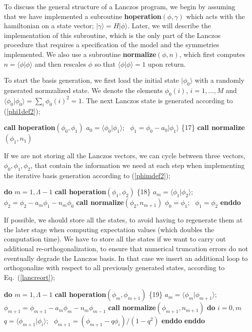 \documentclass[draft,numberedheadings]{aipproc}
\newcommand{\code}{\null\vskip-2mm\noindent}
\newcommand{\br}{\hfill\break}
\newcommand{\cia}{\null\hskip5mm}
\newcommand{\cib}{\null\hskip10mm}
\newcommand{\cic}{\null\hskip15mm}
\begin{document}
To discuss the general structure of a Lanczos program, we begin by assuming that we have implemented a subroutine {\bf hoperation}$(\phi,\gamma)$ which acts with 
the hamiltonian on a state vector; $|\gamma\rangle=H|\phi\rangle$. Later, we will describe the implementation of this subroutine, which is the only part of the 
Lanczos procedure that requires a specification of the model and the symmetries implemented. We also use a subroutine {\bf normalize}$(\phi,n)$, which first 
computes $n=\langle \phi|\phi\rangle$ and then rescales $\phi$ so that $\langle \phi|\phi\rangle=1$ upon return. 

To start the basis generation, we first load the initial state $|\phi_0\rangle$ with a randomly generated normzalized state. We denote the elements 
$\phi_0(i)$, $i=1,\ldots,M$ and $\langle \phi_0|\phi_0\rangle = \sum_i\phi_0(i)^2=1$. The next Lanczos state is generated according to (\ref{phi1def2});

{\code
\cia    {\bf call hoperation}$(\phi_0,\phi_1)$ \br
\cia    $a_0=\langle \phi_0|\phi_1\rangle$;~ $\phi_1=\phi_0-a_0|\phi_1\rangle$ \hfill  \{17\}\break 
\cia    {\bf call normalize}$(\phi_1,n_1)$ 
\code}

\noindent
If we are not storing all the Lanczos vectors, we can cycle between three vectors, $\phi_0,\phi_1,\phi_2$, that contain the information we need at 
each step when implementing the iterative basis generation according to (\ref{phimdef2});

{\code
\cia    {\bf do} $m=1,\Lambda-1$ \br
\cib       {\bf call hoperation}$(\phi_1,\phi_2)$                \hfill  \{18\}\break 
\cib       $a_{m}=\langle \phi_1|\phi_2\rangle$;~ $\phi_2=\phi_2-a_{m}\phi_1-n_m\phi_0$ \br
\cib       {\bf call normalize}$(\phi_2,n_{m+1})$  \br 
\cib       $\phi_0=\phi_1$;~ $\phi_1=\phi_2$ \br
\cia    {\bf enddo} 
\code}

\noindent
If possible, we should store all the states, to avoid having to regenerate them at the later stage when computing expectation values (which doubles
the computation time). We have to store
all the states if we want to carry out additional re-orthogonalization, to ensure that numerical truncation errors do not eventually degrade the Lanczos 
basis. In that case we insert an additional loop to orthogonalize with respect to all previously generated states, according to Eq.~(\ref{lancreort});

{\code
\cia    {\bf do} $m=1,\Lambda-1$ \br
\cib       {\bf call hoperation}$(\phi_m,\phi_{m+1})$ \hfill  \{19\}\break 
\cib       $a_m=\langle \phi_m|\phi_{m+1}\rangle$;~ $\phi_{m+1}=\phi_{m+1}-a_m\phi_m-n_m\phi_{m-1}$ \br
\cib       {\bf call normalize}$(\phi_{m+1},n_{m+1})$  \br 
\cib       {\bf do} $i=0,m$ \br
\cic           $q=\langle \phi_{m+1}|\phi_{i}\rangle$;~ $\phi_{m+1}=(\phi_{m+1}-q\phi_i)/(1-q^2)$ \br
\cib       {\bf enddo} \br
\cia    {\bf enddo} 
\code}
\end{document}
